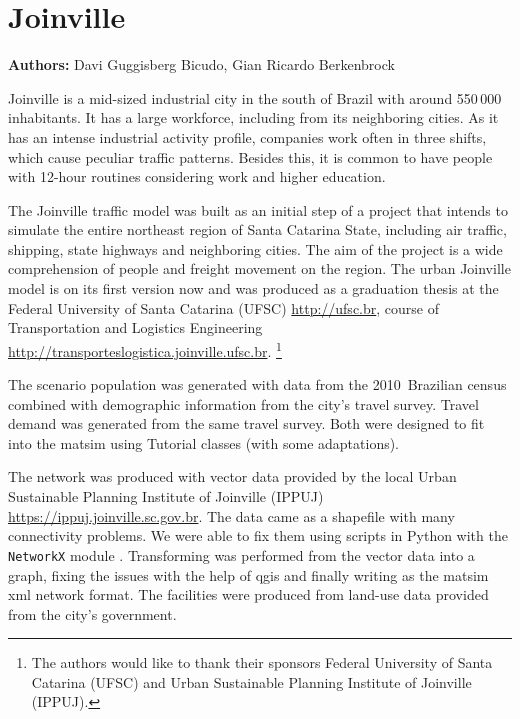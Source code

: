 \chapter{Joinville}
\label{ch:joinville}
\hfill \textbf{Authors:} Davi Guggisberg Bicudo, Gian Ricardo Berkenbrock

Joinville \cite{pmj} is a mid-sized industrial city in the south of Brazil with around 550\,000 inhabitants. It has a large workforce, including from its neighboring cities. As it has an intense industrial activity profile, companies work often in three shifts, which cause peculiar traffic patterns. Besides this, it is common to have people with 12-hour routines considering work and higher education. 

The Joinville traffic model was built as an initial step of a project that intends to simulate the entire northeast region of Santa Catarina State, including air traffic, shipping, state highways and neighboring cities. The aim of the project is a wide comprehension of people and freight movement on the region. The urban Joinville model is on its first version now and was produced as a graduation thesis at the Federal University of Santa Catarina (UFSC) \url{http://ufsc.br}, course of Transportation and Logistics Engineering \url{http://transporteslogistica.joinville.ufsc.br}.%
\footnote{The authors would like to thank their sponsors Federal University of Santa Catarina (UFSC) and Urban Sustainable Planning Institute of Joinville (IPPUJ).} 

The scenario population was generated with data from the 2010~Brazilian census combined with demographic information from the city’s travel survey. Travel demand was generated from the same travel survey. Both were designed to fit into the \gls{matsim} using Tutorial classes (with some adaptations).

The network was produced with vector data provided by the local Urban Sustainable Planning Institute of Joinville (IPPUJ) \url{https://ippuj.joinville.sc.gov.br}. The data came as a shapefile with many connectivity problems. We were able to fix them using scripts in Python with the \lstinline|NetworkX| module \cite{networkx}. Transforming was performed from the vector data into a graph, fixing the issues with the help of \gls{qgis} and finally writing as the \gls{matsim} \gls{xml} network format. The facilities were produced from land-use data provided from the city's government.

